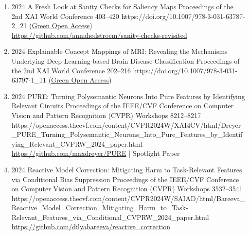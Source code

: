 {\begin{enumerate}
                            
        \item {}
                            {2024}
                            {A Fresh Look at Sanity Checks for Saliency Maps}
                            {Proceedings of the 2nd XAI World Conference}
                            {403--420}
                            {https://doi.org/10.1007/978-3-031-63787-2_21}
                            {(\href{https://arxiv.org/abs/2405.02383}{Green Open Access})
                            \\\href{https://github.com/annahedstroem/sanity-checks-revisited}{https://github.com/annahedstroem/sanity-checks-revisited}}

        \item {}
                            {2024}
                            {Explainable Concept Mappings of MRI: Revealing the Mechanisms Underlying Deep Learning-based Brain Disease Classification}
                            {Proceedings of the 2nd XAI World Conference}
                            {202--216}
                            {https://doi.org/10.1007/978-3-031-63797-1_11}
                            {(\href{https://arxiv.org/abs/2404.10433}{Green Open Access})}


        \item {}
                            {2024}
                            {PURE: Turning Polysemantic Neurons Into Pure Features by Identifying Relevant Circuits}
                            {Proceedings of the IEEE/CVF Conference on Computer Vision and Pattern Recognition (CVPR) Workshops}
                            {8212--8217}
                            {https://openaccess.thecvf.com/content/CVPR2024W/XAI4CV/html/Dreyer_PURE_Turning_Polysemantic_Neurons_Into_Pure_Features_by_Identifying_Relevant_CVPRW_2024_paper.html}
                            {\\\href{https://github.com/maxdreyer/PURE}{https://github.com/maxdreyer/PURE} | 
                            Spotlight Paper}

        \item {}
                            {2024}
                            {Reactive Model Correction: Mitigating Harm to Task-Relevant Features via Conditional Bias Suppression}
                            {Proceedings of the IEEE/CVF Conference on Computer Vision and Pattern Recognition (CVPR) Workshops}
                            {3532--3541}
                            {https://openaccess.thecvf.com/content/CVPR2024W/SAIAD/html/Bareeva_Reactive_Model_Correction_Mitigating_Harm_to_Task-Relevant_Features_via_Conditional_CVPRW_2024_paper.html}
                            {\\\href{https://github.com/dilyabareeva/reactive_correction}{https://github.com/dilyabareeva/reactive\_correction}}                           


\end{enumerate}}

